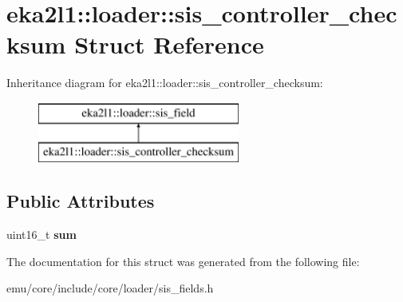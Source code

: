 \hypertarget{structeka2l1_1_1loader_1_1sis__controller__checksum}{}\section{eka2l1\+:\+:loader\+:\+:sis\+\_\+controller\+\_\+checksum Struct Reference}
\label{structeka2l1_1_1loader_1_1sis__controller__checksum}
Inheritance diagram for eka2l1\+:\+:loader\+:\+:sis\+\_\+controller\+\_\+checksum\+:\begin{figure}[H]
\begin{center}
\leavevmode
\includegraphics[height=2.000000cm]{structeka2l1_1_1loader_1_1sis__controller__checksum}
\end{center}
\end{figure}
\subsection*{Public Attributes}
\begin{DoxyCompactItemize}
\item 
\mbox{\label{structeka2l1_1_1loader_1_1sis__controller__checksum_afd0974144691f915380576558b560bd8}} 
uint16\+\_\+t {\bfseries sum}
\end{DoxyCompactItemize}


The documentation for this struct was generated from the following file\+:\begin{DoxyCompactItemize}
\item 
emu/core/include/core/loader/sis\+\_\+fields.\+h\end{DoxyCompactItemize}
